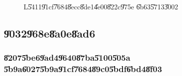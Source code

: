 \begin{figure}[th]
\caption{L\U{5411}\U{91cf}\U{7684}\U{8ecc}\U{8de1}\U{4e00}\U{822c}\U{975e}%
\U{6b63}\U{5713}\U{3002}}
\begin{center}
\end{center}
\end{figure}

\clearpage%

\subsection{\U{9032}\U{968e}\U{8a0e}\U{8ad6}}

\subsubsection{\U{8207}\U{5be6}\U{9ad4}\U{9640}\U{87ba}\U{5100}\U{505a}%
\U{5b9a}\U{6027}\U{5b9a}\U{91cf}\U{7684}\U{89c0}\U{5bdf}\U{6bd4}\U{8f03}}

